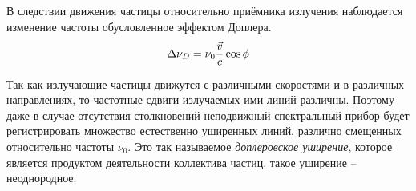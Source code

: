 В следствии движения частицы относительно приёмника излучения наблюдается 
изменение частоты обусловленное эффектом Доплера.
\[
  \Delta\nu_D = \nu_0 \frac{\vec{v}}{c}\cos\phi
\]

Так как излучающие частицы движутся с различными скоростями и в различных 
направлениях, то частотные сдвиги излучаемых ими линий различны. Поэтому даже 
в случае отсутствия столкновений неподвижный спектральный прибор будет 
регистрировать множество естественно уширенных линий, различно смещенных 
относительно частоты \( \nu_0 \). Это так называемое \emph{доплеровское 
уширение}, которое является продуктом деятельности коллектива частиц, такое 
уширение -- неоднородное.